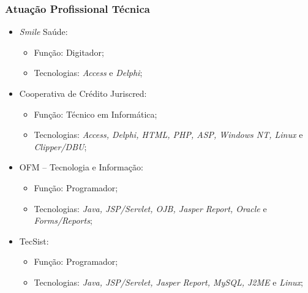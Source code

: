 \documentclass{beamer}
\begin{document}
\begin{frame}
	\frametitle{Atuação Profissional Técnica}

	\begin{itemize}
		\item \textit{Smile} Saúde:
		\begin{itemize}
			\item Função: Digitador;
			\item Tecnologias: \textit{Access} e \textit{Delphi};
		\end{itemize}
		
		\item Cooperativa de Crédito Juriscred:
		\begin{itemize}
			\item Função: Técnico em Informática;
			\item Tecnologias: \textit{Access, Delphi, HTML, PHP, ASP, Windows NT, Linux} e \textit{Clipper/DBU};
		\end{itemize}
		
		\item OFM -- Tecnologia e Informação:
		\begin{itemize}
			\item Função: Programador;
			\item Tecnologias: \textit{Java, JSP/Servlet, OJB, Jasper Report, Oracle} e \textit{Forms/Reports};
		\end{itemize}
		
		\item TecSist:
		\begin{itemize}
			\item Função: Programador;
			\item Tecnologias: \textit{Java, JSP/Servlet, Jasper Report, MySQL, J2ME} e \textit{Linux};
		\end{itemize}
	\end{itemize}
\end{frame}
\end{document}
